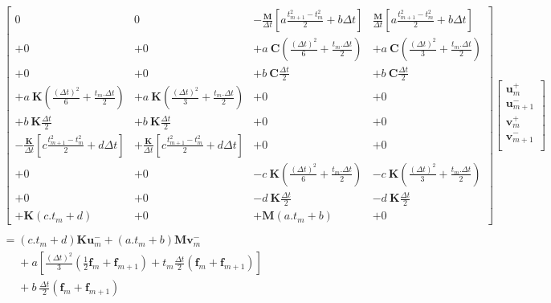 \documentclass[12pt,a4paper]{report}
\begin{document}
\begin{equation}
\!\!\!\!\!\!\!\!\!\!\!\!\!\!\!\!\!\!\!\!\!\!\!\!\!\!\!\!\!\!\!\!\!\!\!
\begin{array}{l }
	\begin{bmatrix}	   
		   0
		   &0
		   &-\frac{\mathbf{M}}{\Delta t}
		   		\left[ a\frac{t_{m+1}^2 - t_m^2}{2} + b \Delta t \right]
		   &\frac{\mathbf{M}}{\Delta t}
		   		\left[ a\frac{t_{m+1}^2 - t_m^2}{2} + b \Delta t \right]
		 \\    
		   +0
		   &+0
		   &+a~\mathbf{C}
		   		(\frac{(\Delta t)^2}{6} + \frac{t_m.\Delta t}{2})
		   &+a~\mathbf{C}
		   		(\frac{(\Delta t)^2}{3} + \frac{t_m.\Delta t}{2})
		 \\    
		   +0
		   &+0
		   &+b~\mathbf{C} \frac{\Delta t}{2}
		   &+b~\mathbf{C} \frac{\Delta t}{2}
		 \\    
		   +a~\mathbf{K}
		   		(\frac{(\Delta t)^2}{6} + \frac{t_m.\Delta t}{2})
		   &+a~\mathbf{K}
		   		(\frac{(\Delta t)^2}{3} + \frac{t_m.\Delta t}{2})
		   &+0
		   &+0
		 \\    
		   +b~\mathbf{K} \frac{\Delta t}{2} 
		   &+b~\mathbf{K} \frac{\Delta t}{2} 
		   &+0
		   &+0
		 \\    
		   -\frac{\mathbf{K}}{\Delta t}
		   		\left[ c\frac{t_{m+1}^2 - t_m^2}{2} + d \Delta t \right]
		   &+\frac{\mathbf{K}}{\Delta t}
		   		\left[ c\frac{t_{m+1}^2 - t_m^2}{2} + d \Delta t \right]
		   &+0
		   &+0
		 \\    
		   +0
		   &+0
		   &-c~\mathbf{K}
		   		(\frac{(\Delta t)^2}{6} + \frac{t_m.\Delta t}{2})
		   &-c~\mathbf{K}
		   		(\frac{(\Delta t)^2}{3} + \frac{t_m.\Delta t}{2})
		 \\    
		   +0
		   &+0
		   &-d~\mathbf{K} \frac{\Delta t}{2}
		   &-d~\mathbf{K} \frac{\Delta t}{2}
		 \\    
		   +\mathbf{K} (c.t_m + d)
		   &+0
		   &+\mathbf{M} (a.t_m + b)
		   &+0
	\end{bmatrix}
	\begin{bmatrix}
		   \mathbf{u}_m^+  		\\
		   \mathbf{u}_{m+1}^-  	\\
		   \mathbf{v}_m^+  		\\
		   \mathbf{v}_{m+1}^-  	\\
	\end{bmatrix}
	\\
	\\
		= 
	     (c.t_m+d) \mathbf{K} \mathbf{u}_m^-
	   + (a.t_m+b) \mathbf{M} \mathbf{v}_m^-
	\\ \phantom{=} +\displaystyle
		a \left[
			\frac{(\Delta t)^2}{3}
				\left( \frac{1}{2} \mathbf{f}_m + \mathbf{f}_{m+1} \right)
			+t_m \frac{\Delta t}{2} (\mathbf{f}_m + \mathbf{f}_{m+1}) 
		\right]
	\\ \phantom{=} +\displaystyle
		 b~ \frac{\Delta t}{2}  (\mathbf{f}_m + \mathbf{f}_{m+1})
	
\end{array}
\end{equation}
\end{document}
